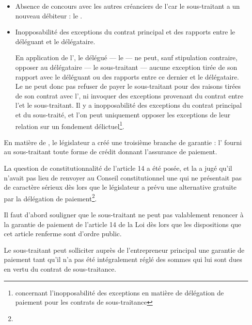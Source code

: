 						\begin{itemize}
							\item Absence de concours avec les autres créanciers de l’\ep car le sous-traitant a un nouveau débiteur : le \Mo.

							\item Inopposabilité des exceptions du contrat principal et des rapports entre le déléguant et le délégataire.

							En application de l', le délégué --- le \Mo --- ne peut, sauf stipulation contraire, opposer au délégataire --- le sous-traitant --- aucune exception tirée de son rapport avec le déléguant ou des rapports entre ce dernier et le délégataire. Le \Mo ne peut donc pas refuser de payer le sous-traitant pour des raisons tirées de son contrat avec l’\ep, ni invoquer des exceptions provenant du contrat entre l'\ep et le sous-traitant.
							\aVerifier Il y a inopposabilité des exceptions du contrat principal et du sous-traité, et l'on peut uniquement opposer les exceptions de leur relation sur un fondement délictuel\footnote{ concernant l’inopposabilité des exceptions en matière de délégation de paiement pour les contrats de sous-traitance}.
						\end{itemize}


						\bigbreak En matière de \CCMI, le législateur a créé une troisième branche de garantie : l' fourni au sous-traitant toute forme de crédit donnant l’assurance de paiement. \aVerifier


						\bigbreak La question de constitutionnalité de l'article 14 a été posée, et la \CourDeCas a jugé qu'il n'avait pas lieu de renvoyer au Conseil constitutionnel une \qpc qui ne présentait pas de caractère sérieux dès lors que le législateur a prévu une alternative gratuite par la délégation de paiement\footnote{}.



						Il faut d'abord souligner que le sous-traitant ne peut pas valablement renoncer à la garantie de paiement de l'article 14 de la Loi dès lors que les dispositions que cet article renferme sont d'ordre public.

						Le sous-traitant peut solliciter auprès de l'entrepreneur principal une garantie de paiement tant qu'il n'a pas été intégralement réglé des sommes qui lui sont dues en vertu du contrat de sous-traitance.

